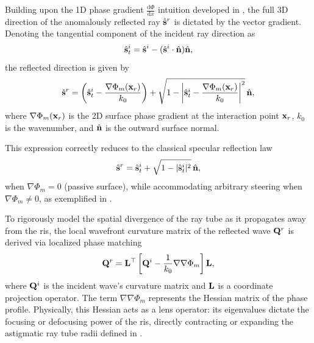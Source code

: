Building upon the 1D phase gradient $\tfrac{\mathrm{d}\Phi}{\mathrm{d}x}$ intuition developed in , the full 3D direction of the anomalously reflected ray $\hat{\mathbf{s}}^r$ is dictated by the vector gradient. Denoting the tangential component of the incident ray direction as
\begin{equation}
  \hat{\mathbf{s}}^i_t = \hat{\mathbf{s}}^i - (\hat{\mathbf{s}}^i \cdot \hat{\mathbf{n}})\hat{\mathbf{n}},
\end{equation}
the reflected direction is given by~
\begin{equation}
  \hat{\mathbf{s}}^r = \left(\hat{\mathbf{s}}^i_t - \frac{\nabla \Phi_m(\mathbf{x}_r)}{k_0}\right) + \sqrt{1 - \left|\hat{\mathbf{s}}^i_t - \frac{\nabla \Phi_m(\mathbf{x}_r)}{k_0}\right|^2} \, \hat{\mathbf{n}},
\end{equation}
where $\nabla \Phi_m(\mathbf{x}_r)$ is the 2D surface phase gradient at the interaction point $\mathbf{x}_r$, $k_0$ is the  \gls{wavenumber}, and $\hat{\mathbf{n}}$ is the outward surface normal.

This expression correctly reduces to the classical specular reflection law
\begin{equation}
  \hat{\mathbf{s}}^r = \hat{\mathbf{s}}^i_t + \sqrt{1 - |\hat{\mathbf{s}}^i_t|^2} \, \hat{\mathbf{n}},
\end{equation}
when $\nabla \Phi_m = 0$ (passive surface), while accommodating arbitrary steering when $\nabla \Phi_m \neq 0$, as exemplified in .

To rigorously model the spatial divergence of the ray tube as it propagates away from the \gls{ris}, the local wavefront curvature matrix of the reflected wave $\mathbf{Q}^r$ is derived via localized phase matching~
\begin{equation}
  \mathbf{Q}^r = \mathbf{L}^\top \left[ \mathbf{Q}^i - \frac{1}{k_0} \nabla\nabla \Phi_m \right] \mathbf{L},
\end{equation}
where $\mathbf{Q}^i$ is the incident wave's curvature matrix and $\mathbf{L}$ is a coordinate projection operator. The term $\nabla\nabla \Phi_m$ represents the Hessian matrix of the phase profile. Physically, this Hessian acts as a lens operator: its eigenvalues dictate the focusing or defocusing power of the \gls{ris}, directly contracting or expanding the astigmatic ray tube radii defined in .

